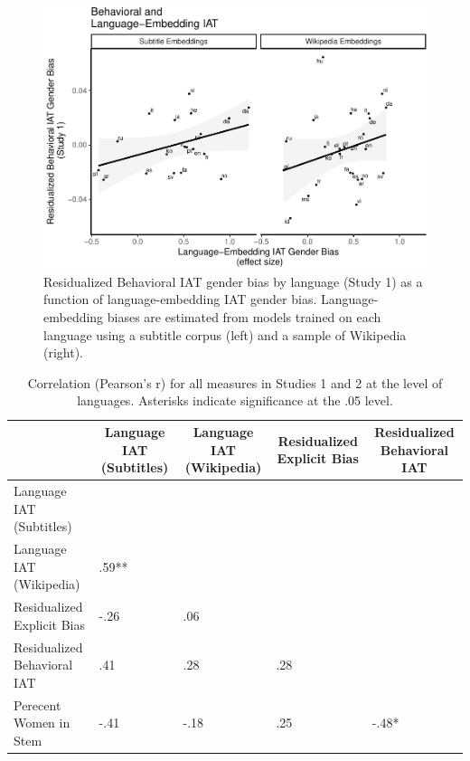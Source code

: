 \documentclass[man]{apa6}
\theoremstyle{definition}
\theoremstyle{definition}
\theoremstyle{definition}
\theoremstyle{remark}
\begin{document}
\begin{figure}
\centering
\includegraphics{iat_lang_files/figure-latex/unnamed-chunk-10-1.pdf}
\caption{\label{fig:unnamed-chunk-10}Residualized Behavioral IAT gender bias
by language (Study 1) as a function of language-embedding IAT gender
bias. Language-embedding biases are estimated from models trained on
each language using a subtitle corpus (left) and a sample of Wikipedia
(right).}
\end{figure}

\begin{table}[tbp]
\begin{center}
\begin{threeparttable}
\caption{\label{tab:coding-table}Correlation (Pearson's r) for all measures in Studies 1 and 2 at the level of languages. Asterisks indicate significance at the .05 level.}
\tiny{
\begin{tabular}{lllll}
\toprule
 & \multicolumn{1}{c}{Language IAT (Subtitles)} & \multicolumn{1}{c}{Language IAT (Wikipedia)} & \multicolumn{1}{c}{Residualized Explicit Bias} & \multicolumn{1}{c}{Residualized Behavioral IAT}\\
\midrule
Language IAT (Subtitles) &  &  &  & \\
Language IAT (Wikipedia) & .59** &  &  & \\
Residualized Explicit Bias & -.26 & .06 &  & \\
Residualized Behavioral IAT & .41 & .28 & .28 & \\
Perecent Women in Stem & -.41 & -.18 & .25 & -.48*\\
\bottomrule
\end{tabular}
}
\end{threeparttable}
\end{center}
\end{table}
\end{document}
